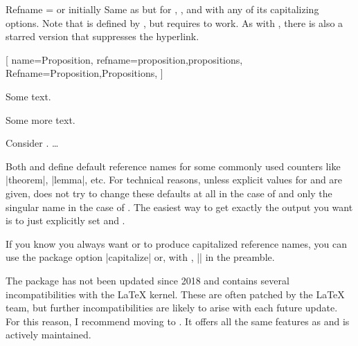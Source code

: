 \documentclass{ltxdoc}
\makeatletter
\newcommand{\TCBkeydescnewline@aux}{ %
  \xpatchcmd{\__tcobox_doc_head_key:}
    {( \tl_use:N \g__tcobox_doc_description_tl}
    {\\[1ex] ( \tl_use:N \g__tcobox_doc_description_tl}
    {}{}
  }
\newcommand{\TCBkeydescnewline}{\ExplSyntaxOn\TCBkeydescnewline@aux\ExplSyntaxOff}
\makeatother
\begin{document}
\begin{docKey}[][before upper=\TCBkeydescnewline]{Refname}
  {= \textrm{or} }
  {initially  }
Same as  but for , , and  with any of its capitalizing options.
Note that  is defined by , but requires  to work.
As with , there is also a starred version  that suppresses the hyperlink.

\begin{codepreamble}
[
  name=Proposition,
  refname={proposition,propositions},
  Refname={Proposition,Propositions},
  ]
\end{codepreamble}

\begin{keythmscode}[withpreamble]
\begin{prop}[label=abc]
Some text.
\end{prop}
\begin{prop}[label=def]
Some more text.
\end{prop}
Consider .  \dots
\end{keythmscode}

\end{docKey}

Both  and  define default reference names for some commonly used counters like |theorem|, |lemma|, etc.
For technical reasons, unless explicit values for  and  are given,  does not try to change these defaults at all in the case of  and only the singular name in the case of .
The easiest way to get exactly the output you want is to just explicitly set  and .

If you know you always want  or  to produce capitalized reference names, you can use the  package option |capitalize| or, with , || in the preamble.

\begin{notebox}
The  package has not been updated since 2018 and contains several incompatibilities with the \LaTeX{} kernel.
These are often patched by the \LaTeX{} team, but further incompatibilities are likely to arise with each future update.
For this reason, I recommend moving to .
It offers all the same features as  and is actively maintained.
\end{notebox}
\end{document}
